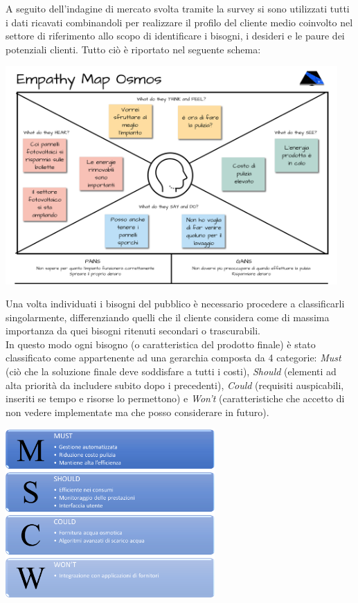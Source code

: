 \documentclass[a4paper, 12pt]{article}
\begin{document}
	A seguito dell'indagine di mercato svolta tramite la survey si sono utilizzati tutti i dati ricavati combinandoli per realizzare il profilo del cliente medio coinvolto nel settore di riferimento allo scopo di identificare i bisogni, i desideri e le paure dei potenziali clienti. Tutto ciò è riportato nel seguente schema:
	\begin{center}
		\includegraphics[width=0.95\textwidth]{Images/EmpathyMap.png}
	\end{center}
	Una volta individuati i bisogni del pubblico è necessario procedere a classificarli singolarmente, differenziando quelli che il cliente considera come di massima importanza da quei bisogni ritenuti secondari o trascurabili.\\
	In questo modo ogni bisogno (o caratteristica del prodotto finale) è stato classificato come appartenente ad una gerarchia composta da 4 categorie: \emph{Must} (ciò che la soluzione finale deve soddisfare a tutti i costi), \emph{Should} (elementi ad alta priorità da includere subito dopo i precedenti), \emph{Could} (requisiti auspicabili, inseriti se tempo e risorse lo permettono) e \emph{Won't} (caratteristiche che accetto di non vedere implementate ma che posso considerare in futuro).
	\begin{center}
		\includegraphics[width=0.6\textwidth]{Images/MoSCoW.png}
	\end{center}
\end{document}

